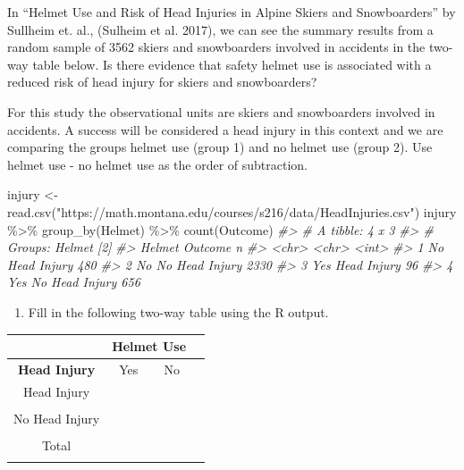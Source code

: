 \documentclass[
]{report}
\newenvironment{Shaded}{\begin{snugshade}}{\end{snugshade}}
\newcommand{\CommentTok}[1]{\textcolor[rgb]{0.56,0.35,0.01}{\textit{#1}}}
\newcommand{\FunctionTok}[1]{\textcolor[rgb]{0.00,0.00,0.00}{#1}}
\newcommand{\NormalTok}[1]{#1}
\newcommand{\OtherTok}[1]{\textcolor[rgb]{0.56,0.35,0.01}{#1}}
\newcommand{\SpecialCharTok}[1]{\textcolor[rgb]{0.00,0.00,0.00}{#1}}
\newcommand{\StringTok}[1]{\textcolor[rgb]{0.31,0.60,0.02}{#1}}
\providecommand{\tightlist}{%
  \setlength{\itemsep}{0pt}\setlength{\parskip}{0pt}}
\begin{document}
In ``Helmet Use and Risk of Head Injuries in Alpine Skiers and Snowboarders'' by Sullheim et. al., (Sulheim et al. 2017), we can see the summary results from a random sample of 3562 skiers and snowboarders involved in accidents in the two-way table below. Is there evidence that safety helmet use is associated with a reduced risk of head injury for skiers and snowboarders?

For this study the observational units are skiers and snowboarders involved in accidents. A success will be considered a head injury in this context and we are comparing the groups helmet use (group 1) and no helmet use (group 2). Use helmet use - no helmet use as the order of subtraction.

\begin{Shaded}
\begin{Highlighting}[]
\NormalTok{injury }\OtherTok{\textless{}{-}} \FunctionTok{read.csv}\NormalTok{(}\StringTok{"https://math.montana.edu/courses/s216/data/HeadInjuries.csv"}\NormalTok{) }
\NormalTok{injury }\SpecialCharTok{\%\textgreater{}\%} \FunctionTok{group\_by}\NormalTok{(Helmet) }\SpecialCharTok{\%\textgreater{}\%} \FunctionTok{count}\NormalTok{(Outcome)}
\CommentTok{\#\textgreater{} \# A tibble: 4 x 3}
\CommentTok{\#\textgreater{} \# Groups:   Helmet [2]}
\CommentTok{\#\textgreater{}   Helmet Outcome            n}
\CommentTok{\#\textgreater{}   \textless{}chr\textgreater{}  \textless{}chr\textgreater{}          \textless{}int\textgreater{}}
\CommentTok{\#\textgreater{} 1 No     Head Injury      480}
\CommentTok{\#\textgreater{} 2 No     No Head Injury  2330}
\CommentTok{\#\textgreater{} 3 Yes    Head Injury       96}
\CommentTok{\#\textgreater{} 4 Yes    No Head Injury   656}
\end{Highlighting}
\end{Shaded}

\newpage

\begin{enumerate}
\def\labelenumi{\arabic{enumi}.}
\tightlist
\item
  Fill in the following two-way table using the R output.
\end{enumerate}

\begin{center}
\begin{tabular}{|c|c|c|c|}\hline
& \multicolumn{2}{|c|}{\textbf{Helmet Use}} & \\ \hline
\textbf{Head Injury} & Yes & No \\ \hline
Head Injury & & & \\ 
 & & & \\ \hline
No Head Injury & & & \\ 
 & & & \\ \hline
 Total & & & \\ 
 & & & \\ \hline
\end{tabular}
\end{center}
\end{document}
